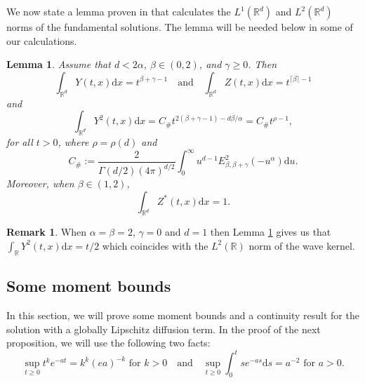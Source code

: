 \documentclass[a4paper,11pt]{article}
\numberwithin{equation}{section}
\theoremstyle{plain}
\newtheorem{lemma}[theorem]{Lemma}
\theoremstyle{definition}
\newtheorem{remark}[theorem]{Remark}
\newcommand{\ud}{\ensuremath{\mathrm{d} }}
\newcommand{\R}{\mathbb{R}}
\numberwithin{NQ}{section}
\numberwithin{LQ}{section}
\numberwithin{ZQ}{section}
\begin{document}
We now state a lemma proven in \cite{chen.hu.ea:19:nonlinear} that calculates the $L^1(\R^d)$ and
$L^2(\R^d)$ norms of the fundamental solutions. The lemma will be needed below in some of our
calculations.

\begin{lemma}{\cite[Theorem 4.1 and Lemma 5.5]{chen.hu.ea:19:nonlinear}} \label{L:1and2normYZ}
  Assume that $d < 2\alpha$, $\beta \in (0,2)$, and $\gamma \ge 0$. Then
  \[
  \int_{\R^d} Y(t,x) \ud x = t^{\beta+\gamma -1 } \quad \text{and} \quad \int_{\R^d} Z(t,x) \ud x= t^{\lceil \beta \rceil -1}
  \]
  and
  \[
  \int_{\R^d} Y^2(t,x) \ud x = C_{\#} t^{2(\beta+\gamma-1)-d\beta/\alpha} = C_{\#} t^{\rho -1} ,
  \]
  for all $t > 0$, where $\rho = \rho(d)$ and
  \[
  C_{\#} := \frac{2}{\Gamma(d/2)(4 \pi )^{d/2}} \int_0^\infty u^{d-1}E^2_{\beta,\beta + \gamma}(-u^\alpha) \ud u.
  \]
  Moreover, when $\beta \in (1,2)$,
  \[
  \int_{\R^d} Z^*(t,x) \ud x= 1.
  \]
\end{lemma}
\begin{remark}
  When $\alpha = \beta = 2$, $\gamma = 0$ and $d=1$ then Lemma \ref{L:1and2normYZ} gives us that
  $\int_{\R} Y^2(t,x) \ud x = t/2$ which coincides with the $L^2(\R)$ norm of the wave kernel.
\end{remark}

\subsection{Some moment bounds}

In this section, we will prove some moment bounds and a continuity result for the solution with a
globally Lipschitz diffusion term. In the proof of the next proposition, we will use the following
two facts:
\begin{equation} \label{E:SUPidentities}
  \sup_{t\ge0} t^ke^{-at} = k^k(ea)^{-k} \text{ for }k > 0 \quad \text{and} \quad \sup_{t \ge 0} \int_0^t s e^{-as} \ud s = a^{-2} \text{ for } a>0.
\end{equation}
\end{document}
